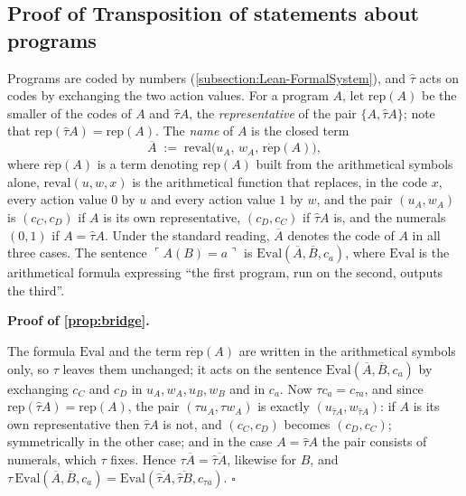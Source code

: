 \documentclass[twoside,11pt]{article}
\renewcommand{\BlackBox}{\ensuremath{\square}}
\renewenvironment{proof}[1][Proof]{%
  \par\noindent\textbf{#1.}\enspace\ignorespaces
}{%
  \ifhmode\unskip\nobreak\hfill\quad\else\noindent\hfill\fi
  \BlackBox\par\addvspace{2mm}%
}
\begin{document}
\subsection{Proof of Transposition of statements about programs}
\label{apx-subsection:Theory-ProofTransposePrograms}
\begin{definition}\label{def:names}
Programs are coded by numbers (\cref{subsection:Lean-FormalSystem}), and $\hat\tau$ acts on codes by exchanging the two action values. For a program $A$, let $\mathrm{rep}(A)$ be the smaller of the codes of $A$ and $\hat\tau A$, the \emph{representative} of the pair $\{A, \hat\tau A\}$; note that $\mathrm{rep}(\hat\tau A) = \mathrm{rep}(A)$. The \emph{name} of $A$ is the closed term
\[
  \overline{A} \;:=\; \mathrm{reval}\big(u_A,\, w_A,\, \dot{\mathrm{rep}}(A)\big),
\]
where $\dot{\mathrm{rep}}(A)$ is a term denoting $\mathrm{rep}(A)$ built from the arithmetical symbols alone, $\mathrm{reval}(u, w, x)$ is the arithmetical function that replaces, in the code $x$, every action value $0$ by $u$ and every action value $1$ by $w$, and the pair $(u_A, w_A)$ is $(c_C, c_D)$ if $A$ is its own representative, $(c_D, c_C)$ if $\hat\tau A$ is, and the numerals $(0, 1)$ if $A = \hat\tau A$. Under the standard reading, $\overline{A}$ denotes the code of $A$ in all three cases. The sentence $\ulcorner A(B) = a\urcorner$ is $\mathrm{Eval}(\overline{A}, \overline{B}, c_a)$, where $\mathrm{Eval}$ is the arithmetical formula expressing \enquote{the first program, run on the second, outputs the third}.
\end{definition}

\begin{proof}[Proof of \cref{prop:bridge}]
The formula $\mathrm{Eval}$ and the term $\dot{\mathrm{rep}}(A)$ are written in the arithmetical symbols only, so $\tau$ leaves them unchanged; it acts on the sentence $\mathrm{Eval}(\overline{A}, \overline{B}, c_a)$ by exchanging $c_C$ and $c_D$ in $u_A, w_A, u_B, w_B$ and in $c_a$. Now $\tau c_a = c_{\tau a}$, and since $\mathrm{rep}(\hat\tau A) = \mathrm{rep}(A)$, the pair $(\tau u_A, \tau w_A)$ is exactly $(u_{\hat\tau A}, w_{\hat\tau A})$: if $A$ is its own representative then $\hat\tau A$ is not, and $(c_C, c_D)$ becomes $(c_D, c_C)$; symmetrically in the other case; and in the case $A = \hat\tau A$ the pair consists of numerals, which $\tau$ fixes. Hence $\tau\overline{A} = \overline{\hat\tau A}$, likewise for $B$, and $\tau\,\mathrm{Eval}(\overline{A}, \overline{B}, c_a) = \mathrm{Eval}(\overline{\hat\tau A}, \overline{\hat\tau B}, c_{\tau a})$.
\end{proof}
\end{document}
